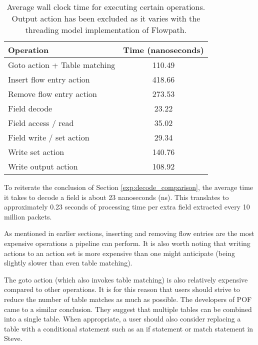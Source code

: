 \begin{table}[ht]
\caption{Average wall clock time for executing certain operations. Output action has been excluded as it varies with the threading model implementation of Flowpath.}
\begin{center}
\begin{tabularx}{\linewidth}{| X || c | }
\hline
Operation & Time (nanoseconds)  \\
\hline
Goto action + Table matching & 110.49 \\
\hline
Insert flow entry action & 418.66 \\
\hline
Remove flow entry action & 273.53 \\
\hline
Field decode & 23.22 \\
\hline
Field access / read & 35.02 \\
\hline
Field write / set action & 29.34 \\
\hline
Write set action &  140.76 \\
\hline
Write output action & 108.92 \\
\hline
\end{tabularx}
\end{center}
\label{tbl:action_stats}
\end{table}

To reiterate the conclusion of Section \ref{exp:decode_comparison}, the average time it takes to decode a field is about 23 nanoseconds (ns). This translates to approximately 0.23 seconds of processing time per extra field extracted every 10 million packets.

As mentioned in earlier sections, inserting and removing flow entries are the most expensive operations a pipeline can perform. It is also worth noting that writing actions to an action set is more expensive than one might anticipate (being slightly slower than even table matching).

The goto action (which also invokes table matching) is also relatively expensive compared to other operations. It is for this reason that users should strive to reduce the number of table matches as much as possible. The developers of POF \cite{pof_impl} came to a similar conclusion. They suggest that multiple tables can be combined into a single table. When appropriate, a user should also consider replacing a table with a conditional statement such as an if statement or match statement in Steve.